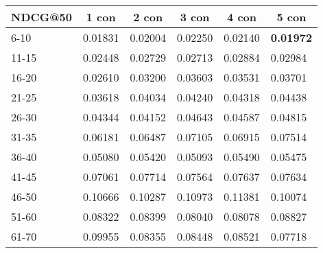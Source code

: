 \begin{table*}[]
    \begin{tabular}{|l|l|l|l|l|l|}
    \hline
    NDCG@50 & \multicolumn{1}{c|}{1 con} & \multicolumn{1}{c|}{2 con} & \multicolumn{1}{c|}{3 con} & \multicolumn{1}{c|}{4 con} & \multicolumn{1}{c|}{5 con} \\ \hline
    6-10    & 0.01831                    & 0.02004                    & 0.02250                    & 0.02140                    & \textbf{0.01972}           \\ \hline
    11-15   & 0.02448                    & 0.02729                    & 0.02713                    & 0.02884                    & 0.02984                    \\ \hline
    16-20   & 0.02610                    & 0.03200                    & 0.03603                    & 0.03531                    & 0.03701                    \\ \hline
    21-25   & 0.03618                    & 0.04034                    & 0.04240                    & 0.04318                    & 0.04438                    \\ \hline
    26-30   & 0.04344                    & 0.04152                    & 0.04643                    & 0.04587                    & 0.04815                    \\ \hline
    31-35   & 0.06181                    & 0.06487                    & 0.07105                    & 0.06915                    & 0.07514                    \\ \hline
    36-40   & 0.05080                    & 0.05420                    & 0.05093                    & 0.05490                    & 0.05475                    \\ \hline
    41-45   & 0.07061                    & 0.07714                    & 0.07564                    & 0.07637                    & 0.07634                    \\ \hline
    46-50   & 0.10666                    & 0.10287                    & 0.10973                    & 0.11381                    & 0.10074                    \\ \hline
    51-60   & 0.08322                    & 0.08399                    & 0.08040                    & 0.08078                    & 0.08827                    \\ \hline
    61-70   & 0.09955                    & 0.08355                    & 0.08448                    & 0.08521                    & 0.07718                    \\ \hline

\end{tabular}
\end{table*}
